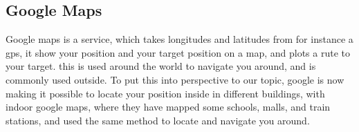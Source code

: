 
\subsection{Google Maps}
Google maps is a service, which takes longitudes and latitudes from for instance a gps, it show your position and your target position on a map, and plots a rute to your target. this is used around the world to navigate you around, and is commonly used outside. To put this into perspective to our topic, google is now making it possible to locate your position inside in different buildings, with indoor google maps, where they have mapped some schools, malls, and train stations, and used the same method to locate and navigate you around.






